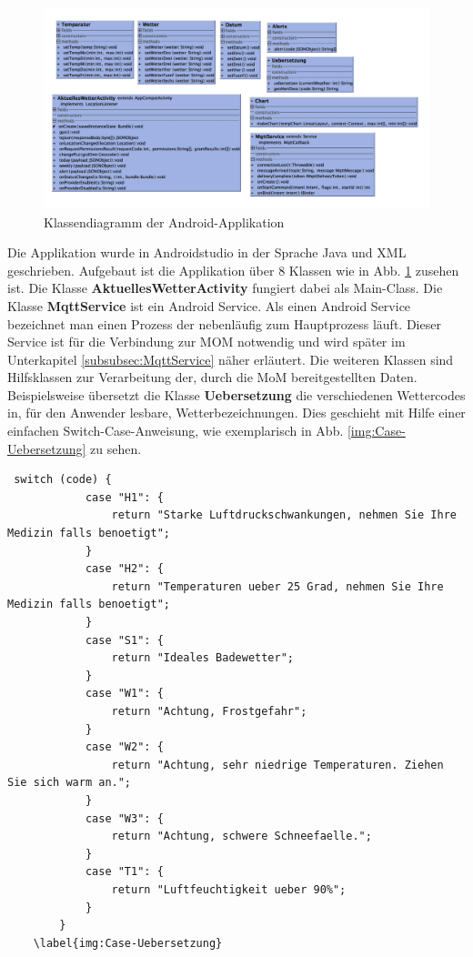 \begin{figure}[htbp]
	\centering
	\includegraphics[width=1.0\textwidth]{Bilder/AndroidUML.png}
	\caption{Klassendiagramm der Android-Applikation}
	\label{img:AndroidUMLDiagramm}
\end{figure} 
Die Applikation wurde in Androidstudio in der Sprache Java und XML geschrieben. 
Aufgebaut ist die Applikation über 8 Klassen wie in  Abb. \ref{img:AndroidUMLDiagramm} zusehen ist. Die Klasse \textbf{AktuellesWetterActivity} fungiert dabei als Main-Class.
Die Klasse \textbf{MqttService} ist ein Android Service. Als einen Android Service bezeichnet man einen Prozess der nebenläufig zum Hauptprozess läuft. Dieser Service ist für die Verbindung zur MOM notwendig und wird später im Unterkapitel \ref{subsubsec:MqttService} näher erläutert.
Die weiteren Klassen sind Hilfsklassen zur Verarbeitung der, durch die MoM bereitgestellten Daten.
Beispielsweise übersetzt die Klasse \textbf{Uebersetzung} die verschiedenen Wettercodes in, für den Anwender lesbare, Wetterbezeichnungen. Dies geschieht mit Hilfe einer einfachen Switch-Case-Anweisung, wie exemplarisch in Abb. \ref{img:Case-Uebersetzung} zu sehen.
  \begin{lstlisting}
 switch (code) {
            case "H1": {
                return "Starke Luftdruckschwankungen, nehmen Sie Ihre Medizin falls benoetigt";
            }
            case "H2": {
                return "Temperaturen ueber 25 Grad, nehmen Sie Ihre Medizin falls benoetigt";
            }
            case "S1": {
                return "Ideales Badewetter";
            }
            case "W1": {
                return "Achtung, Frostgefahr";
            }
            case "W2": {
                return "Achtung, sehr niedrige Temperaturen. Ziehen Sie sich warm an.";
            }
            case "W3": {
                return "Achtung, schwere Schneefaelle.";
            }
            case "T1": {
                return "Luftfeuchtigkeit ueber 90%";
            }
        }
	\label{img:Case-Uebersetzung}
\end{lstlisting} 

